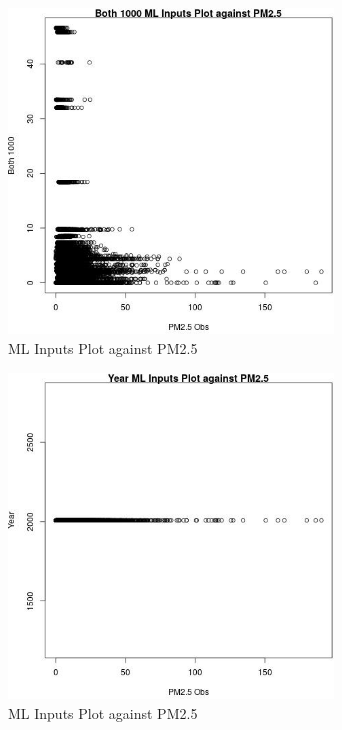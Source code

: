 \begin{figure} 
\centering  
\includegraphics[width=0.77\textwidth]{Code_Outputs/Report_ML_input_PM25_Step4_part_e_de_duplicated_aves_Both_1000vPM25_Obs.jpg} 
\caption{\label{fig:Report_ML_input_PM25_Step4_part_e_de_duplicated_avesBoth_1000vPM25_Obs}ML Inputs Plot against PM2.5} 
\end{figure} 
 

\begin{figure} 
\centering  
\includegraphics[width=0.77\textwidth]{Code_Outputs/Report_ML_input_PM25_Step4_part_e_de_duplicated_aves_YearvPM25_Obs.jpg} 
\caption{\label{fig:Report_ML_input_PM25_Step4_part_e_de_duplicated_avesYearvPM25_Obs}ML Inputs Plot against PM2.5} 
\end{figure} 
 

